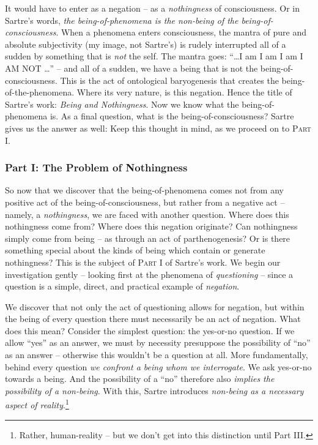 It would have to enter as a negation -- as a \emph{nothingness} of consciousness. Or in Sartre's words, \emph{the being-of-phenomena is the non-being of the being-of-consciousness}. When a phenomena enters consciousness, the mantra of pure and absolute subjectivity (my image, not Sartre's) is rudely interrupted all of a sudden by something that is \emph{not} the self. The mantra goes: \enquote{\ldots I am I am I am I AM NOT \ldots} -- and all of a sudden, we have a being that is not the being-of-consciousness. This is the act of ontological baryogenesis that creates the being-of-the-phenomena. Where its very nature, is this negation. Hence the title of Sartre's work: \emph{Being and Nothingness}. Now we know what the being-of-phenomena is. As a final question, what is the being-of-consciousness? Sartre gives us the answer as well:  Keep this thought in mind, as we proceed on to \textsc{Part I}.

\subsubsection{Part I: The Problem of Nothingness}

So now that we discover that the being-of-phenomena comes not from any positive act of the being-of-consciousness, but rather from a negative act -- namely, a \emph{nothingness}, we are faced with another question. Where does this nothingness come from? Where does this negation originate? Can nothingness simply come from being -- as through an act of parthenogenesis? Or is there something special about the kinds of being which contain or generate nothingness? This is the subject of \textsc{Part I} of Sartre's work. We begin our investigation gently -- looking first at the phenomena of \emph{questioning} -- since a question is a simple, direct, and practical example of \emph{negation}. 

We discover that not only the act of questioning allows for negation, but within the being of every question there must necessarily be an act of negation. What does this mean? Consider the simplest question: the yes-or-no question. If we allow \enquote{yes} as an answer, we must by necessity presuppose the possibility of \enquote{no} as an answer -- otherwise this wouldn't be a question at all. More fundamentally, behind every question \emph{we confront a being whom we interrogate}. We ask yes-or-no towards a being. And the possibility of a \enquote{no} therefore also \emph{implies the possibility of a non-being}. With this, Sartre introduces \emph{non-being as a necessary aspect of reality}.\footnote{Rather, human-reality -- but we don't get into this distinction until Part III.}


